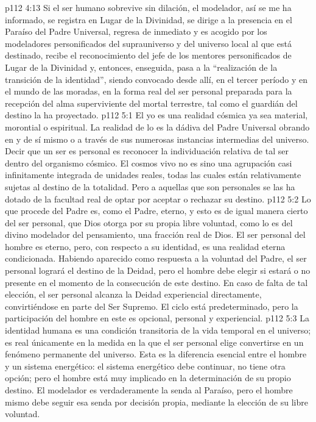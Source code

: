 \vs p112 4:13 Si el ser humano sobrevive sin dilación, el modelador, así se me ha informado, se registra en Lugar de la Divinidad, se dirige a la presencia en el Paraíso del Padre Universal, regresa de inmediato y es acogido por los modeladores personificados del suprauniverso y del universo local al que está destinado, recibe el reconocimiento del jefe de los mentores personificados de Lugar de la Divinidad y, entonces, enseguida, pasa a la “realización de la transición de la identidad”, siendo convocado desde allí, en el tercer período y en el mundo de las moradas, en la forma real del ser personal preparada para la recepción del alma superviviente del mortal terrestre, tal como el guardián del destino la ha proyectado.
\vs p112 5:1 El yo es una realidad cósmica ya sea material, morontial o espiritual. La realidad de lo  es la dádiva del Padre Universal obrando en y de sí mismo o a través de sus numerosas instancias intermedias del universo. Decir que un ser es personal es reconocer la individuación relativa de tal ser dentro del organismo cósmico. El cosmos vivo no es sino una agrupación casi infinitamente integrada de unidades reales, todas las cuales están relativamente sujetas al destino de la totalidad. Pero a aquellas que son personales se las ha dotado de la facultad real de optar por aceptar o rechazar su destino.
\vs p112 5:2 Lo que procede del Padre es, como el Padre, eterno, y esto es de igual manera cierto del ser personal, que Dios otorga por su propia libre voluntad, como lo es del divino modelador del pensamiento, una fracción real de Dios. El ser personal del hombre es eterno, pero, con respecto a su identidad, es una realidad eterna condicionada. Habiendo aparecido como respuesta a la voluntad del Padre, el ser personal logrará el destino de la Deidad, pero el hombre debe elegir si estará o no presente en el momento de la consecución de este destino. En caso de falta de tal elección, el ser personal alcanza la Deidad experiencial directamente, convirtiéndose en parte del Ser Supremo. El ciclo está predeterminado, pero la participación del hombre en este es opcional, personal y experiencial.
\vs p112 5:3 \pc La identidad humana es una condición transitoria de la vida temporal en el universo; es real únicamente en la medida en la que el ser personal elige convertirse en un fenómeno permanente del universo. Esta es la diferencia esencial entre el hombre y un sistema energético: el sistema energético debe continuar, no tiene otra opción; pero el hombre está muy implicado en la determinación de su propio destino. El modelador es verdaderamente la senda al Paraíso, pero el hombre mismo debe seguir esa senda por decisión propia, mediante la elección de su libre voluntad.
